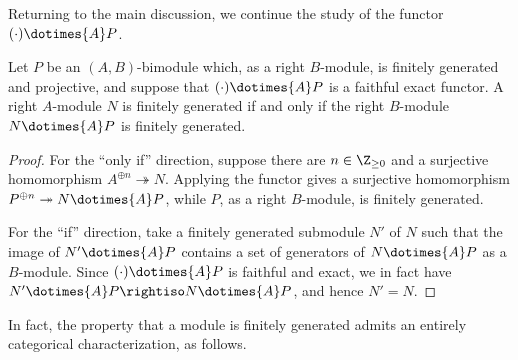 Returning to the main discussion, we continue the study of the functor
$(\mathord\cdot)\dotimes{A}P$.

\begin{proposition}\label{prop:Morita-comonad-ft}
	Let $P$ be an $(A,B)$-bimodule which, as a right $B$-module, is finitely
	generated and projective, and suppose that
	$(\mathord\cdot)\dotimes{A}P$ is a faithful exact functor. A right
	$A$-module $N$ is finitely generated if and only if the right $B$-module
	$N\dotimes{A}P$ is finitely generated.
\end{proposition}
\begin{proof}
	For the ``only if'' direction, suppose there are $n\in\Z_{\geq0}$ and a
	surjective homomorphism $A^{\oplus n}\twoheadrightarrow N$. Applying the
	functor gives a surjective homomorphism
	$P^{\oplus n}\twoheadrightarrow N\dotimes{A}P$, while $P$, as a right
	$B$-module, is finitely generated.

	For the ``if'' direction, take a finitely generated submodule $N'$ of $N$
	such that the image of $N'\dotimes{A}P$ contains a set of generators of
	$N\dotimes{A}P$ as a $B$-module. Since
	$(\mathord\cdot)\dotimes{A}P$ is faithful and exact, we in fact have
	$N'\dotimes{A}P\rightiso N\dotimes{A}P$, and hence $N'=N$.
\end{proof}

In fact, the property that a module is finitely generated admits an entirely
categorical characterization, as follows.
